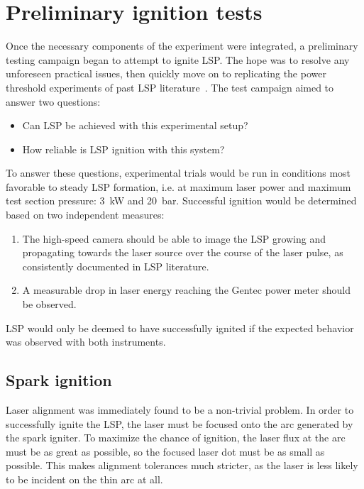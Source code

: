     \section{Preliminary ignition tests} \label{sec:ignitiontest}
        Once the necessary components of the experiment were integrated, a preliminary testing campaign began to attempt to ignite LSP. The hope was to resolve any unforeseen practical issues, then quickly move on to replicating the power threshold experiments of past LSP literature~\cite{zimakovInteractionNearIRLaser2016,matsuiGeneratingConditionsArgon2019,luCharacteristicDiagnosticsLaserStabilized2022}. The test campaign aimed to answer two questions:
        \begin{itemize}
            \item Can LSP be achieved with this experimental setup?
            \item How reliable is LSP ignition with this system?
        \end{itemize}
        To answer these questions, experimental trials would be run in conditions most favorable to steady LSP formation, i.e. at maximum laser power and maximum test section pressure: \qty{3}{kW} and \qty{20}{bar}. Successful ignition would be determined based on two independent measures:
        \begin{enumerate}
            \item The high-speed camera should be able to image the LSP growing and propagating towards the laser source over the course of the laser pulse, as consistently documented in LSP literature.
            \item A measurable drop in laser energy reaching the Gentec power meter should be observed.
        \end{enumerate}
        LSP would only be deemed to have successfully ignited if the expected behavior was observed with both instruments.

        \subsection{Spark ignition} \label{subsec:results_sparkignition}
            Laser alignment was immediately found to be a non-trivial problem. In order to successfully ignite the LSP, the laser must be focused onto the arc generated by the spark igniter. To maximize the chance of ignition, the laser flux at the arc must be as great as possible, so the focused laser dot must be as small as possible. This makes alignment tolerances much stricter, as the laser is less likely to be incident on the thin arc at all.

